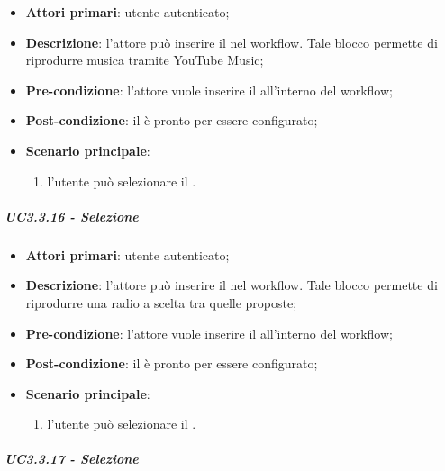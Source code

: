 \begin{itemize}
\item \textbf{Attori primari}: utente autenticato;

\item \textbf{Descrizione}: l'attore può inserire il \BYouTubeMusic{} nel workflow. Tale blocco permette di riprodurre musica tramite YouTube Music;

\item \textbf{Pre-condizione}: l'attore vuole inserire il \BYouTubeMusic{} all'interno del workflow;

\item \textbf{Post-condizione}: il \BYouTubeMusic{} è pronto per essere configurato;

\item \textbf{Scenario principale}:
\begin{enumerate}
\item  l'utente può selezionare il \BYouTubeMusic{}.

\end{enumerate}
\end{itemize}

\subparagraph{UC3.3.16 - Selezione \BRadio{}}

\begin{itemize}
\item \textbf{Attori primari}: utente autenticato;

\item \textbf{Descrizione}: l'attore può inserire il \BRadio{} nel workflow. Tale blocco permette di riprodurre una radio a scelta tra quelle proposte;

\item \textbf{Pre-condizione}: l'attore vuole inserire il \BRadio{} all'interno del workflow;

\item \textbf{Post-condizione}: il \BRadio{} è pronto per essere configurato;

\item \textbf{Scenario principale}:
\begin{enumerate}
\item  l'utente può selezionare il \BRadio{}.

\end{enumerate}
\end{itemize}

\subparagraph{UC3.3.17 - Selezione \BTV{}}

